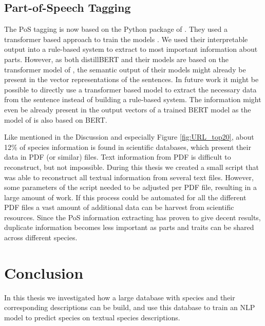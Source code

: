 \documentclass[a4paper, 12pt, oneside]{book} %
\begin{document}
\subsection{Part-of-Speech Tagging}
The PoS tagging is now based on the Python package of \textcite{honnibal_spacy_2020}.
They used a transformer based approach to train the models \autocite{wolf_huggingfaces_2020, vaswani_attention_2017}.
We used their interpretable output into a rule-based system to extract to most important information about parts.
However, as both distillBERT and their models are based on the transformer model of \textcite{vaswani_attention_2017}, the semantic output of their models might already be present in the vector representations of the sentences.
In future work it might be possible to directly use a transformer based model to extract the necessary data from the sentence instead of building a rule-based system.
The information might even be already present in the output vectors of a trained BERT model as the model of \textcite{wolf_huggingfaces_2020} is also based on BERT.



Like mentioned in the Discussion and especially Figure \ref{fig:URL_top20}, about 12\% of species information is found in scientific databases, which present their data in PDF (or similar) files.
Text information from PDF is difficult to reconstruct, but not impossible.
During this thesis we created a small script that was able to reconstruct all textual information from several text files.
However, some parameters of the script needed to be adjusted per PDF file, resulting in a large amount of work.
If this process could be automated for all the different PDF files a vast amount of additional data can be harvest from scientific resources.
Since the PoS information extracting has proven to give decent results, duplicate information becomes less important as parts and traits can be shared across different species.

\newpage
\section{Conclusion} \label{par:conclusion}
In this thesis we investigated how a large database with species and their corresponding descriptions can be build, and use this database to train an NLP model to predict species on textual species descriptions.
\end{document}
